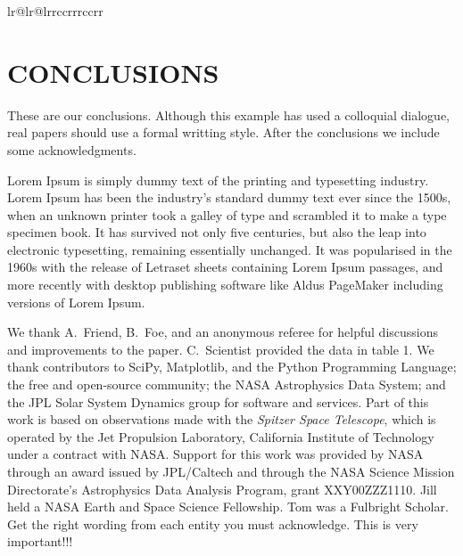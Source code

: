 \begin{table}[t]
\begin{deluxetable*}{lr@{}lr@{}lrrccrrrccrr}
\end{deluxetable*}
\end{table}

\section{CONCLUSIONS}
\label{sec:conclusions}

These are our conclusions.  Although this example has used a colloquial
dialogue, real papers should use a formal writting style.  After the
conclusions we include some acknowledgments.

Lorem Ipsum is simply dummy text of the printing and typesetting
industry. Lorem Ipsum has been the industry's standard dummy text ever
since the 1500s, when an unknown printer took a galley of type and
scrambled it to make a type specimen book. It has survived not only
five centuries, but also the leap into electronic typesetting,
remaining essentially unchanged. It was popularised in the 1960s with
the release of Letraset sheets containing Lorem Ipsum passages, and
more recently with desktop publishing software like Aldus PageMaker
including versions of Lorem Ipsum.


\acknowledgments

We thank A.\ Friend, B.\ Foe, and an anonymous referee for helpful
discussions and improvements to the paper.  C.\ Scientist provided the
data in table 1.
We thank contributors to SciPy, Matplotlib, and the Python Programming
Language; the free and open-source community; the NASA Astrophysics
Data System; and the JPL Solar System Dynamics group for software and
services.
Part of this work is based on observations made with the
{\em Spitzer Space Telescope}, which is operated by the Jet Propulsion
Laboratory, California Institute of Technology under a contract with
NASA.
Support for this work was provided by NASA through an award
issued by JPL/Caltech and through the NASA Science Mission
Directorate's Astrophysics Data Analysis Program, grant
XXY00ZZZ1110.
Jill held a NASA Earth and Space Science Fellowship.  Tom was a
Fulbright Scholar.  Get the right wording from each entity you must
acknowledge.  This is very important!!!

